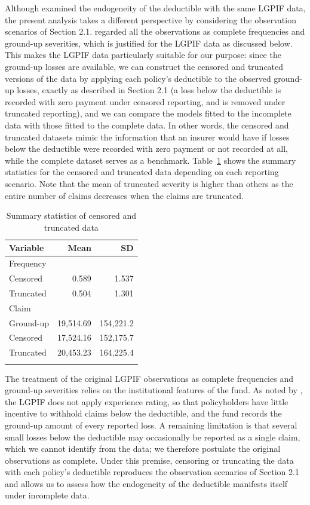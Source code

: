 \documentclass[11pt]{article}
\newcommand{\rev}[1]{{\color{blue}#1}}
\begin{document}
\rev{Although \citet{shi2022copula} examined the endogeneity of the deductible with the same LGPIF data, the present analysis takes a different perspective by considering the observation scenarios of Section 2.1. \citet{shi2022copula} regarded all the observations as complete frequencies and ground-up severities, which is justified for the LGPIF data as discussed below. This makes the LGPIF data particularly suitable for our purpose: since the ground-up losses are available, we can construct the censored and truncated versions of the data by applying each policy's deductible to the observed ground-up losses, exactly as described in Section 2.1 (a loss below the deductible is recorded with zero payment under censored reporting, and is removed under truncated reporting), and we can compare the models fitted to the incomplete data with those fitted to the complete data. In other words, the censored and truncated datasets mimic the information that an insurer would have if losses below the deductible were recorded with zero payment or not recorded at all, while the complete dataset serves as a benchmark.} Table~\ref{tab:data summary} shows the summary statistics for the censored and truncated data depending on each reporting scenario. Note that the mean of truncated severity is higher than others as the entire number of claims decreases when the claims are truncated.\\

\begin{table}[h!]
\centering
\begin{tabular}[t]{lrr}
\toprule
  Variable  & Mean & SD\\
\midrule
Frequency\\
\quad Censored  & 0.589 & 1.537\\
\quad Truncated & 0.504 & 1.301\\
Claim \\
\quad Ground-up & 19,514.69 & 154,221.2\\
\quad Censored & 17,524.16 & \rev{152,175.7}\\
\quad Truncated & 20,453.23 & 164,225.4\\
\hhline{===}
\end{tabular}
\caption{Summary statistics of censored and truncated data}
\label{tab:data summary}
\end{table}


\rev{The treatment of the original LGPIF observations as complete frequencies and ground-up severities relies on the institutional features of the fund. As noted by \citet{shi2022copula}, the LGPIF does not apply experience rating, so that policyholders have little incentive to withhold claims below the deductible, and the fund records the ground-up amount of every reported loss. A remaining limitation is that several small losses below the deductible may occasionally be reported as a single claim, which we cannot identify from the data; we therefore postulate the original observations as complete. Under this premise, censoring or truncating the data with each policy's deductible reproduces the observation scenarios of Section 2.1 and allows us to assess how the endogeneity of the deductible manifests itself under incomplete data.}
\end{document}
